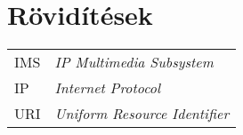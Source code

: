 

\section{Rövidítések}
\label{sec:roviditesek}

\begin{tabular}{p{2cm}l}
IMS & \emph{IP Multimedia Subsystem} \\
IP & \emph{Internet Protocol} \\
URI & \emph{Uniform Resource Identifier} \\
\end{tabular}

